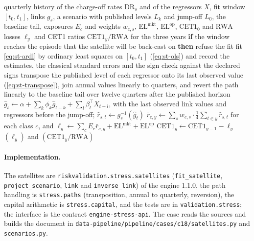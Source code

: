 \begin{algorithm}[htbp]
\caption{From a macroeconomic scenario to the loss path and the capital ratio of the static balance sheet.}
\label{alg:st-chain}
\begin{algorithmic}[1]
\Require quarterly history of the charge-off rates $\mathrm{DR}_s$ and of the regressors $X$, fit window $[t_0,t_1]$, links $g_s$, a scenario with published levels $L_k$ and jump-off $L_0$, the baseline tail, exposures $E_c$ and weights $w_{c,s}$, $\mathrm{EL}^{\mathrm{mkt}}$, $\mathrm{EL}^{\mathrm{op}}$, $\mathrm{CET1}_0$ and $\mathrm{RWA}$
\Ensure losses $\ell_y$ and CET1 ratios $\mathrm{CET1}_y/\mathrm{RWA}$ for the three years
  \State \textbf{if} the window reaches the episode that the satellite will be back-cast on \textbf{then} refuse the fit
  \State fit \cref{eq:st-ardl} by ordinary least squares on $[t_0,t_1]$ (\cref{eq:st-ols}) and record the estimates, the classical standard errors and the sign check against the declared signs
\EndFor
\State transpose the published level of each regressor onto its last observed value (\cref{eq:st-transpose}), join annual values linearly to quarters, and revert the path linearly to the baseline tail over twelve quarters after the published horizon
  \State $\hat g_t\gets\alpha+\sum_k\phi_k\hat g_{t-k}+\sum_l\beta_l^{\top}X_{t-l}$, with the last observed link values and regressors before the jump-off; $\hat r_{s,t}\gets g_s^{-1}(\hat g_t)$
\EndFor
{}
  \State $\bar r_{c,y}\gets\sum_sw_{c,s}\cdot\tfrac14\sum_{t\in y}\hat r_{s,t}$ for each class $c$, and $\ell_y\gets\sum_cE_c\bar r_{c,y}+\mathrm{EL}^{\mathrm{mkt}}+\mathrm{EL}^{\mathrm{op}}$
  \State $\mathrm{CET1}_y\gets\mathrm{CET1}_{y-1}-\ell_y$
\EndFor
\State \Return $(\ell_y)$ and $(\mathrm{CET1}_y/\mathrm{RWA})$
\end{algorithmic}
\end{algorithm}

\paragraph{Implementation.}
The satellites are \texttt{riskvalidation.stress.satellites} (\texttt{fit\_satellite}, \texttt{project\_scenario},
\texttt{link} and \texttt{inverse\_link}) of the engine 1.1.0, the path handling is \texttt{stress.paths} (transposition,
annual to quarterly, reversion), the capital arithmetic is \texttt{stress.capital}, and the tests are in
\texttt{validation.stress}; the interface is the contract \texttt{engine-stress-api}. The case reads the sources and builds the
document in \texttt{data-pipeline/pipeline/cases/c18/satellites.py} and \texttt{scenarios.py}.

